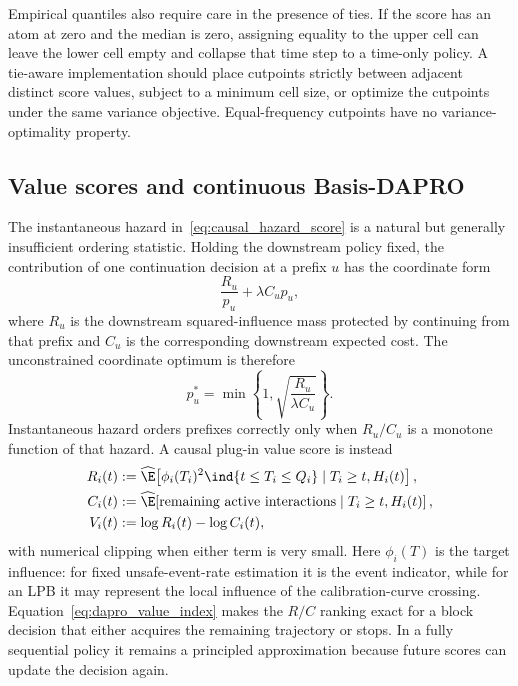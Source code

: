 Empirical quantiles also require care in the presence of ties.  If the score
has an atom at zero and the median is zero, assigning equality to the upper
cell can leave the lower cell empty and collapse that time step to a time-only
policy.  A tie-aware implementation should place cutpoints strictly between
adjacent distinct score values, subject to a minimum cell size, or optimize
the cutpoints under the same variance objective.  Equal-frequency cutpoints
have no variance-optimality property.

\subsection{Value scores and continuous Basis-DAPRO}
\label{sec:basis_dapro}

The instantaneous hazard in~\eqref{eq:causal_hazard_score} is a natural but
generally insufficient ordering statistic.  Holding the downstream policy
fixed, the contribution of one continuation decision at a prefix $u$ has the
coordinate form
\begin{equation}
    \frac{R_u}{p_u}+\lambda C_u p_u,
\end{equation}
where $R_u$ is the downstream squared-influence mass protected by continuing
from that prefix and $C_u$ is the corresponding downstream expected cost.
The unconstrained coordinate optimum is therefore
\begin{equation}
    p_u^*=\min\left\{1,\sqrt{\frac{R_u}{\lambda C_u}}\right\}.
    \label{eq:dapro_value_index}
\end{equation}
Instantaneous hazard orders prefixes correctly only when $R_u/C_u$ is a
monotone function of that hazard.  A causal plug-in value score is instead
\begin{equation}
\begin{split}
    R_i(t)&:=\widehat\E\!\left[
      \phi_i(T_i)^2\ind{t\leq T_i\leq Q_i}
      \mid T_i\geq t,H_i(t)\right],\\
    C_i(t)&:=\widehat\E\!\left[
      \text{remaining active interactions}
      \mid T_i\geq t,H_i(t)\right],\\
    V_i(t)&:=\log R_i(t)-\log C_i(t),
\end{split}
\label{eq:dapro_value_score}
\end{equation}
with numerical clipping when either term is very small.  Here $\phi_i(T)$ is
the target influence: for fixed unsafe-event-rate estimation it is the event
indicator, while for an LPB it may represent the local influence of the
calibration-curve crossing.  Equation~\eqref{eq:dapro_value_index} makes the
$R/C$ ranking exact for a block decision that either acquires the remaining
trajectory or stops.  In a fully sequential policy it remains a principled
approximation because future scores can update the decision again.

